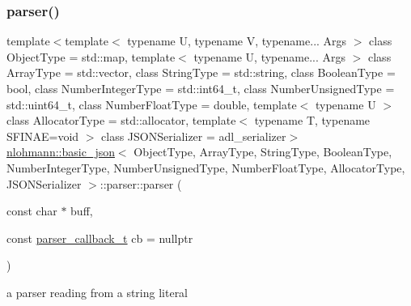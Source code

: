 \subsubsection{\texorpdfstring{parser()}{parser()}\hspace{0.1cm}{\footnotesize\ttfamily [1/3]}}
{\footnotesize\ttfamily template$<$template$<$ typename U, typename V, typename... Args $>$ class Object\+Type = std\+::map, template$<$ typename U, typename... Args $>$ class Array\+Type = std\+::vector, class String\+Type  = std\+::string, class Boolean\+Type  = bool, class Number\+Integer\+Type  = std\+::int64\+\_\+t, class Number\+Unsigned\+Type  = std\+::uint64\+\_\+t, class Number\+Float\+Type  = double, template$<$ typename U $>$ class Allocator\+Type = std\+::allocator, template$<$ typename T, typename S\+F\+I\+N\+A\+E=void $>$ class J\+S\+O\+N\+Serializer = adl\+\_\+serializer$>$ \\
\hyperlink{classnlohmann_1_1basic__json}{nlohmann\+::basic\+\_\+json}$<$ Object\+Type, Array\+Type, String\+Type, Boolean\+Type, Number\+Integer\+Type, Number\+Unsigned\+Type, Number\+Float\+Type, Allocator\+Type, J\+S\+O\+N\+Serializer $>$\+::parser\+::parser (\begin{DoxyParamCaption}\item[{const char $\ast$}]{buff,  }\item[{const \hyperlink{classnlohmann_1_1basic__json_aecae491e175f8767c550ae3c59e180e3}{parser\+\_\+callback\+\_\+t}}]{cb = {\ttfamily nullptr} }\end{DoxyParamCaption})\hspace{0.3cm}{\ttfamily [inline]}}



a parser reading from a string literal 

\mbox{\label{classnlohmann_1_1basic__json_1_1parser_a2fb8e838d9d27dd7fc0dc3f7935a0ad8}} 
